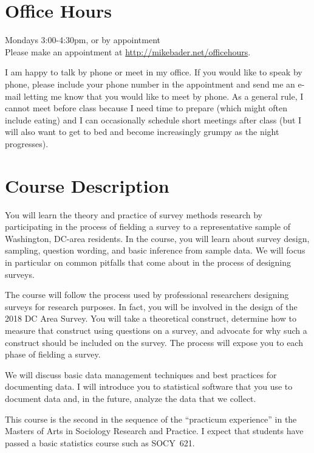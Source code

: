 \documentclass[11pt]{syllabus}
\author{Michael Bader}
\begin{document}
\maketitle 

\section{Office Hours}
Mondays 3:00-4:30pm, or by appointment \\
Please make an appointment at \url{http://mikebader.net/officehours}. 

I am happy to talk by phone or meet in my office. If you would like to speak by phone, please include your phone number in the appointment and send me an e-mail letting me know that you would like to meet by phone. As a general rule, I cannot meet before class because I need time to prepare (which might often include eating) and I can occasionally schedule short meetings after class (but I will also want to get to bed and become increasingly grumpy as the night progresses). 

\section{Course Description}
You will learn the theory and practice of survey methods research by participating in the process of fielding a survey to a representative sample of Washington, DC-area residents. In the course, you will learn about survey design, sampling, question wording, and basic inference from sample data. We will focus in particular on common pitfalls that come about in the process of designing surveys. 

The course will follow the process used by professional researchers designing surveys for research purposes. In fact, you will be involved in the design of the 2018 DC Area Survey. You will take a theoretical construct, determine how to measure that construct using questions on a survey, and advocate for why such a construct should be included on the survey. The process will expose you to each phase of fielding a survey. 

We will discuss basic data management techniques and best practices for documenting data. I will introduce you to statistical software that you use to document data and, in the future, analyze the data that we collect. 

This course is the second in the sequence of the ``practicum experience'' in the Masters of Arts in Sociology Research and Practice. I expect that students have passed a basic statistics course such as SOCY~621.
\end{document}

